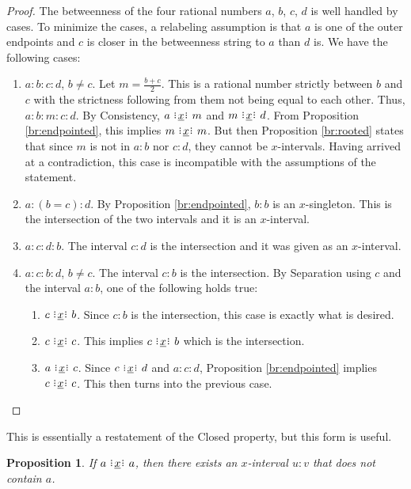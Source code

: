 \documentclass[12pt]{article}
\newtheorem{proposition}{Proposition}[section]
\begin{document}
\begin{proof}
    The betweenness of the four rational numbers $a$, $b$, $c$, $d$ is well handled by cases. To minimize the cases, a relabeling assumption is that $a$ is one of the outer endpoints and $c$ is closer in the betweenness string to $a$ than $d$ is. We have the following cases: 

    \begin{enumerate}
        \item $a:b:c:d$, $b \neq c$. Let $m = \frac{b+c}{2}$. This is a rational number strictly between $b$ and $c$ with the strictness following from them not being equal to each other. Thus, $a:b:m:c:d$. By Consistency, $a\xrel m$ and $m \xrel d$. From Proposition \ref{br:endpointed}, this implies $m \xrel m$. But then Proposition \ref{br:rooted} states that since $m$ is not in $a:b$ nor $c:d$, they cannot be $x$-intervals. Having arrived at a contradiction, this case is incompatible with the assumptions of the statement. 
        \item $a:(b=c):d$. By Proposition \ref{br:endpointed}, $b:b$ is an $x$-singleton. This is the intersection of the two intervals and it is an $x$-interval. 
        \item $a:c:d:b$. The interval $c:d$ is the intersection and it was given as an $x$-interval. 
        \item $a:c:b:d$, $b \neq c$. The interval $c:b$ is the intersection. By Separation using $c$ and the interval $a:b$, one of the following holds true: 
        \begin{enumerate}
            \item $c \xrel b$. Since $c:b$ is the intersection, this case is exactly what is desired.
            \item $c \xrel c$. This implies $c \xrel b$ which is the intersection. 
            \item $a \xrel c$. Since $c \xrel d$ and $a:c:d$, Proposition \ref{br:endpointed} implies $c \xrel c$. This then turns into the previous case. 
        \end{enumerate}
    \end{enumerate}
\end{proof}

This is essentially a restatement of the Closed property, but this form is useful. 

\begin{proposition}\label{br:not-rooted-separated}
    If \sout{$a \xrel a$}, then there exists an $x$-interval $u:v$ that does not contain $a$. 
\end{proposition}
\end{document}
